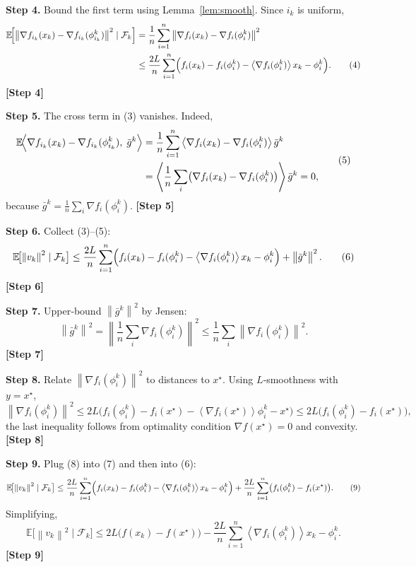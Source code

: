 \documentclass{article}
\newcommand{\E}{\mathbb{E}}
\newcommand{\norm}[1]{\left\|#1\right\|}
\newcommand{\inner}[1]{\left\langle #1 \right\rangle}
\begin{document}
\noindent\textbf{Step 4.}  Bound the first term using Lemma~\ref{lem:smooth}.
Since $i_k$ is uniform,
\[
\begin{aligned}
\E\!\Bigl[\norm{\nabla f_{i_k}(x_k)-\nabla f_{i_k}(\phi_{i_k}^k)}^2\mid\mathcal{F}_k\Bigr]
&= \frac{1}{n}\sum_{i=1}^{n}\norm{\nabla f_i(x_k)-\nabla f_i(\phi_i^k)}^2\\
&\le \frac{2L}{n}\sum_{i=1}^{n}\Bigl(f_i(x_k)-f_i(\phi_i^k)-\inner{\nabla f_i(\phi_i^k)}{x_k-\phi_i^k}\Bigr). \tag{4}
\end{aligned}
\]
\textbf{[Step 4]}

\noindent\textbf{Step 5.}  The cross term in (3) vanishes.
Indeed,
\[
\begin{aligned}
\E\!\Bigl\langle \nabla f_{i_k}(x_k)-\nabla f_{i_k}(\phi_{i_k}^k),\;\bar g^k\Bigr\rangle
&= \frac{1}{n}\sum_{i=1}^{n}\inner{\nabla f_i(x_k)-\nabla f_i(\phi_i^k)}{\bar g^k}\\
&= \inner{\frac{1}{n}\sum_i\bigl(\nabla f_i(x_k)-\nabla f_i(\phi_i^k)\bigr)}{\bar g^k}=0,
\end{aligned}
\tag{5}
\]
because $\bar g^k=\frac{1}{n}\sum_i\nabla f_i(\phi_i^k)$. \textbf{[Step 5]}

\noindent\textbf{Step 6.}  Collect (3)–(5):
\[
\E\!\bigl[\norm{v_k}^2\mid\mathcal{F}_k\bigr]
\le \frac{2L}{n}\sum_{i=1}^{n}\Bigl(f_i(x_k)-f_i(\phi_i^k)-\inner{\nabla f_i(\phi_i^k)}{x_k-\phi_i^k}\Bigr)
      +\norm{\bar g^k}^2. \tag{6}
\]
\textbf{[Step 6]}

\noindent\textbf{Step 7.}  Upper‑bound $\norm{\bar g^k}^2$ by Jensen:
\[
\norm{\bar g^k}^2
= \norm{\frac{1}{n}\sum_i\nabla f_i(\phi_i^k)}^2
\le \frac{1}{n}\sum_i\norm{\nabla f_i(\phi_i^k)}^2 .
\tag{7}
\]
\textbf{[Step 7]}

\noindent\textbf{Step 8.}  Relate $\norm{\nabla f_i(\phi_i^k)}^2$ to distances to $x^\star$.
Using $L$‑smoothness with $y=x^\star$,
\[
\norm{\nabla f_i(\phi_i^k)}^2
\le 2L\bigl(f_i(\phi_i^k)-f_i(x^\star)-\inner{\nabla f_i(x^\star)}{\phi_i^k-x^\star}\bigr)
\le 2L\bigl(f_i(\phi_i^k)-f_i(x^\star)\bigr), \tag{8}
\]
the last inequality follows from optimality condition $\nabla f(x^\star)=0$ and convexity. \textbf{[Step 8]}

\noindent\textbf{Step 9.}  Plug (8) into (7) and then into (6):
\[
\E\!\bigl[\norm{v_k}^2\mid\mathcal{F}_k\bigr]
\le \frac{2L}{n}\sum_{i=1}^{n}\Bigl(f_i(x_k)-f_i(\phi_i^k)-\inner{\nabla f_i(\phi_i^k)}{x_k-\phi_i^k}\Bigr)
      +\frac{2L}{n}\sum_{i=1}^{n}\bigl(f_i(\phi_i^k)-f_i(x^\star)\bigr). \tag{9}
\]
Simplifying,
\[
\E\!\bigl[\norm{v_k}^2\mid\mathcal{F}_k\bigr]
\le 2L\bigl(f(x_k)-f(x^\star)\bigr)
      -\frac{2L}{n}\sum_{i=1}^{n}\inner{\nabla f_i(\phi_i^k)}{x_k-\phi_i^k}. \tag{10}
\]
\textbf{[Step 9]}
\end{document}
